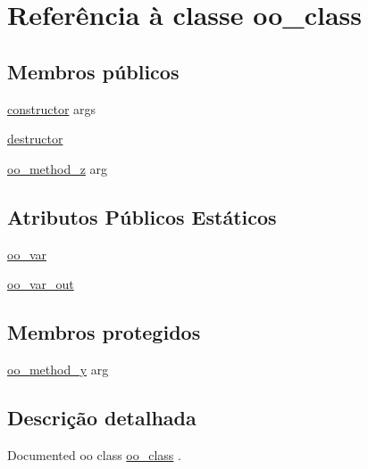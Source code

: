 \hypertarget{classns_1_1oo__class}{\section{Referência à classe oo\-\_\-class}
\label{classns_1_1oo__class}
}
\subsection*{Membros públicos}
\begin{DoxyCompactItemize}
\item 
\hyperlink{classns_1_1oo__class_a774a51943bf6609f7582ee38c55a13f0}{constructor} args
\item 
\hyperlink{classns_1_1oo__class_aa04747d49a3a74e75fcfdaf017a73877}{destructor}
\item 
\hyperlink{classns_1_1oo__class_aa4571e8afadc9c5c0d0f45a5ffa4cecb}{oo\-\_\-method\-\_\-z} arg
\end{DoxyCompactItemize}
\subsection*{Atributos Públicos Estáticos}
\begin{DoxyCompactItemize}
\item 
\hyperlink{classns_1_1oo__class_a0db9c0f77e13b0938595c27ae93fc47d}{oo\-\_\-var}
\item 
\hyperlink{classns_1_1oo__class_ab81ae08f4b693af6731d12ee2827971b}{oo\-\_\-var\-\_\-out}
\end{DoxyCompactItemize}
\subsection*{Membros protegidos}
\begin{DoxyCompactItemize}
\item 
\hyperlink{classns_1_1oo__class_a93b2189732a4ddb6583f19c1a4406e10}{oo\-\_\-method\-\_\-y} arg
\end{DoxyCompactItemize}


\subsection{Descrição detalhada}
Documented oo class {\ttfamily \hyperlink{classns_1_1oo__class}{oo\-\_\-class}} . 

